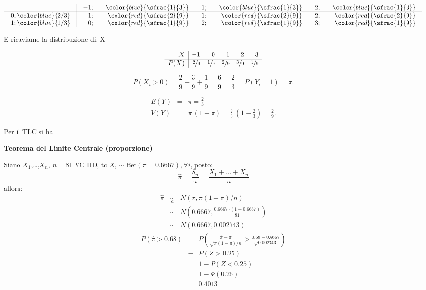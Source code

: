 \documentclass[
  11pt,
]{book}
\theoremstyle{mytheoremstyle}
\theoremstyle{mydefstyle}
\newenvironment{sol}
  {
  \begin{tcolorbox}[enhanced,breakable,arc=0.1mm,boxrule=1pt,colback=white,colframe=iblue,
  title=\bf \fontfamily{lmss}\selectfont \hspace{.5 cm} Soluzione,drop fuzzy shadow]

}{
\end{tcolorbox}
  }
\begin{document}
\begin{sol}

\normalsize

\[\arraycolsep=10pt\def\arraystretch{1}\begin{array}{ r|rrrrrr }
& -1 ;&\color{blue}{ \sfrac{ 1 } { 3 }} & 1 ;&\color{blue}{ \sfrac{ 1 } { 3 }} & 2 ;&\color{blue}{ \sfrac{ 1 } { 3 }} \\ 
\hline 
0 ;\color{blue}{ 2 / 3 }& -1;&\color{red}{\sfrac{2}{9}}& 1;&\color{red}{\sfrac{2}{9}}& 2;&\color{red}{\sfrac{2}{9}}\\ 
1 ;\color{blue}{ 1 / 3 }& 0;&\color{red}{\sfrac{1}{9}}& 2;&\color{red}{\sfrac{1}{9}}& 3;&\color{red}{\sfrac{1}{9}}\\ 
\end{array}
 \]

\normalsize E ricaviamo la distribuzione di, X

\normalsize

\[
     \begin{array}{ r|rrrrr }
 X  & -1& 0& 1& 2& 3 \\ 
 \hline 
 P( X ) & \sfrac{2}{9}& \sfrac{1}{9}& \sfrac{2}{9}& \sfrac{3}{9}& \sfrac{1}{9} \\ 
 \end{array}
 \]

\begin{displaymath}
P(X_{i}>0) = \frac{2}{9} + \frac{3}{9} + \frac{1}{9}
           = \frac{6} {9} = \frac{2} {3}
           = P(Y_{i}=1) =\pi  .
\end{displaymath}

\begin{eqnarray*}
E(Y) &=& \pi = \frac{2} {3}           \\
V(Y) &=& \pi\ (1-\pi)
      = \frac{2} {3}\ \left( 1- \frac{2} {3} \right)
      = \frac{2} {9}   .
\end{eqnarray*}

Per il TLC si ha

\textbf{Teorema del Limite Centrale (proporzione)}

Siano \(X_1\),\ldots,\(X_n\), \(n=81\) VC IID, tc \(X_i\sim\text{Ber}(\pi=0.6667)\)\(,\forall i\), posto:
\[
      \hat\pi=\frac{S_n}n = \frac{X_1 + ... + X_n}n
      \]
allora:\begin{eqnarray*}
  \hat\pi & \mathop{\sim}\limits_{a}& N(\pi,\pi(1-\pi)/n) \\
  &\sim & N\left(0.6667,\frac{0.6667\cdot(1-0.6667)}{81}\right) \\
     &\sim & N(0.6667,0.002743) 
  \end{eqnarray*}\begin{eqnarray*}
      P( \hat\pi   >   0.68 ) 
        &=& P\left(  \frac { \hat\pi  -  \pi }{ \sqrt{\pi(1-\pi)/n} }  >  \frac { 0.68  -  0.6667 }{\sqrt{ 0.002743 }} \right)  \\
                 &=& P\left(  Z   >   0.25 \right) \\    &=& 1-P(Z< 0.25 )\\ 
                 &=&  1-\Phi( 0.25 ) \\ &=&  0.4013 
      \end{eqnarray*}

\end{sol}
\end{document}
